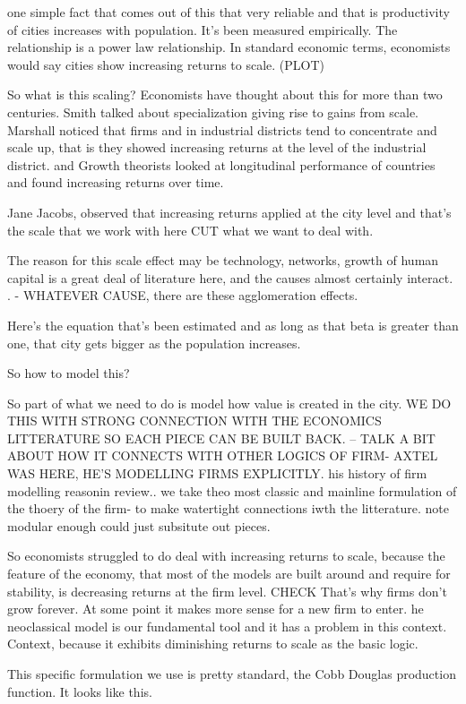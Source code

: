 one simple fact that comes out of this that very reliable and that is 
productivity of cities increases with population. It's been measured empirically. The relationship is a power law relationship.
In  standard economic terms, economists would say cities show increasing returns to scale. (PLOT)

So what is this  scaling?
Economists have thought about this for more than two centuries. Smith talked about specialization giving rise to gains from scale. 
Marshall noticed that firms and in industrial districts tend to concentrate and scale up, that is they showed increasing returns at the level of the industrial district. 
and Growth theorists looked at longitudinal performance of countries and found increasing returns over time.

Jane Jacobs, observed that increasing returns applied at the city level and that's the scale that we work with here CUT what we want to deal with.

The reason for this scale effect may be technology, networks, growth of human capital is a great deal of literature here, and the causes almost certainly interact. . - WHATEVER CAUSE, there are these agglomeration effects. 

Here's the equation that's been estimated and as long as that beta is greater than one, that city gets bigger as the population increases.

So how to model this?

So part of what we need to do is model how value is created in the city. 
WE DO THIS WITH STRONG CONNECTION WITH THE ECONOMICS LITTERATURE SO EACH PIECE CAN BE BUILT BACK. -- 
TALK A BIT ABOUT HOW IT CONNECTS WITH OTHER LOGICS OF FIRM- AXTEL WAS HERE, HE'S MODELLING FIRMS EXPLICITLY. 
his history of firm modelling reasonin review..
we take theo most classic and mainline formulation of the thoery of the firm- to make watertight connections iwth the litterature. note modular enough could just subsitute out pieces. 

So economists struggled to do deal with increasing returns to scale, because the feature of the economy, that most of the models are built around and require for stability, is decreasing returns at the firm level. CHECK That's why firms don't grow forever.  At some point it makes more sense for a new firm to enter.
he neoclassical model is our fundamental tool and it has a problem in this context. Context, because it exhibits diminishing returns to scale as the basic logic.

This specific formulation we use is pretty standard, the Cobb Douglas production function.  It looks like this.

